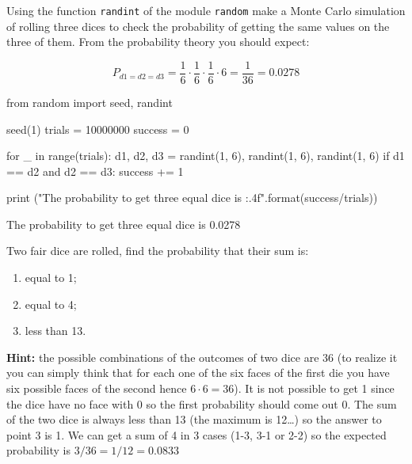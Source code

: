 \begin{question}
Using the function \texttt{randint} of the module \texttt{random} make a Monte Carlo simulation of rolling three dices to check the probability of getting the same values on the three of them.
From the probability theory you should expect:

\[P_{d1=d2=d3} = \frac{1}{6}\cdot\frac{1}{6}\cdot\frac{1}{6}\cdot 6 = \frac{1}{36} = 0.0278\]
\end{question}

\begin{solution}
\end{solution}

\begin{ipython}
from random import seed, randint

seed(1)
trials = 10000000
success = 0

for _ in range(trials):
    d1, d2, d3 = randint(1, 6), randint(1, 6), randint(1, 6)
    if d1 == d2 and d2 == d3:
        success += 1

print ("The probability to get three equal dice is {:.4f}".format(success/trials))

The probability to get three equal dice is 0.0278
\end{ipython}

\begin{question}
Two fair dice are rolled, find the probability that their sum is:
\begin{enumerate}[start=1]
	\item equal to 1;
	\item equal to 4;
	\item less than 13.
\end{enumerate}
	
\noindent\textbf{Hint:} the possible combinations of the outcomes of two dice are 36 (to realize it you can simply think that for each one of the six faces of the first die you have six possible faces of the second hence $6\cdot 6=36$). It is not possible to get 1 since the dice have no face with 0 so the first probability should come out 0. The sum of the two dice is always less than 13 (the maximum is 12\ldots) so the answer to point 3 is 1. We can get a sum of 4 in 3 cases (1-3, 3-1 or 2-2) so the expected probability is $3/36=1/12=0.0833$
\end{question}

\begin{solution}
\end{solution}

